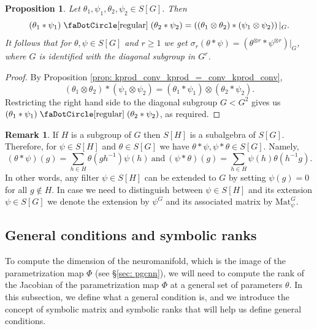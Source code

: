 \documentclass[final]{article}
\newcommand{\Mat}{\text{Mat}}
\newcommand{\conv}{\ast}
\newcommand{\circbd}{\mathrel{\text{\faDotCircle[regular]}}}
\theoremstyle{definition}
\newtheorem{remark}[definition]{Remark}
\theoremstyle{plain}
\newtheorem{proposition}[definition]{Proposition}
\begin{document}
\begin{proposition}\label{prop: circbd_kprod_conv_relation}
    Let $\theta_1, \psi_1, \theta_2, \psi_2 \in S[G]$. Then
    \[
    (\theta_1 \conv \psi_1) \circbd (\theta_2 \conv \psi_2) = \left((\theta_1 \otimes \theta_2) \conv (\psi_1 \otimes \psi_2)\right) |_G.
    \]
    It follows that for $\theta, \psi \in S[G]$ and $r\geq 1$ we get $\sigma_r(\theta \conv \psi) = (\theta^{\otimes r} \conv \psi^{\otimes r})|_G$, where $G$ is identified with the diagonal subgroup in $G^r$.
\end{proposition}
\begin{proof}
    By Proposition \ref{prop: kprod_conv_kprod_=_conv_kprod_conv},
    \[
    (\theta_1 \otimes \theta_2) \conv (\psi_1 \otimes \psi_2) = (\theta_1 \conv \psi_1) \otimes (\theta_2 \conv \psi_2).
    \]
    Restricting the right hand side to the diagonal subgroup $G < G^2$ gives us $(\theta_1 \conv \psi_1) \circbd (\theta_2 \conv \psi_2)$, as required.
\end{proof}



\begin{remark}
    If $H$ is a subgroup of $G$ then $S[H]$ is a subalgebra of $S[G]$. 
    Therefore, for $\psi \in S[H]$ and $\theta\in S[G]$ we have $\theta \conv \psi, \psi \conv \theta \in S[G]$. Namely,
    \[
    (\theta \conv \psi)(g) = \sum_{h\in H} \theta(gh^{-1}) \psi(h)\ \text{and}\   (\psi \conv \theta)(g) = \sum_{h\in H} \psi(h)\theta(h^{-1} g).
    \]
    In other words, any filter $\psi \in S[H]$ can be extended to $G$ by setting $\psi(g) = 0$ for all $g\notin H$.
    In  case we need to distinguish between $\psi \in S[H]$ and its extension $\psi \in S[G]$ we denote the extension by $\psi^G$ and its associated matrix by $\Mat_\psi^G$. 

\end{remark}

\subsection{General conditions and symbolic ranks}
To compute the dimension of the neuromanifold, which is the image of the parametrization map $\Phi$ (see §\ref{sec: pgcnn}), we will need to compute the rank of the Jacobian of the parametrization map $\Phi$ at a general set of parameters $\theta$.
In this subsection, we define what a general condition is, and we introduce the concept of symbolic matrix and symbolic ranks that will help us define general conditions.
\end{document}
